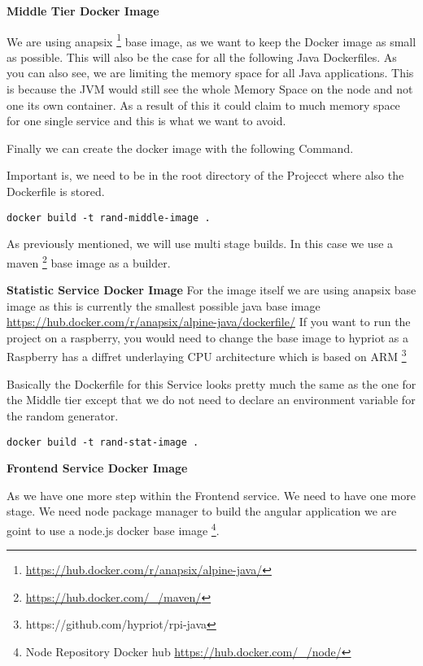 \textbf{Middle Tier Docker Image}


We are using anapsix \footnote{\url{https://hub.docker.com/r/anapsix/alpine-java/}} base image, as we want to keep the Docker image as small as possible. This will also be the case for all the following Java Dockerfiles.
As you can also see, we are limiting the memory space for all Java applications. This is because the JVM would still see the whole Memory Space on the node and not one its own container. As a result of this it could claim to much memory space for one single service and this is what we want to avoid.

Finally we can create the docker image with the following Command.

Important is, we need to be in the root directory of the Projecct where also the Dockerfile is stored.
\begin{verbatim}
docker build -t rand-middle-image .
\end{verbatim}
As previously mentioned, we will use multi stage builds. In this case we use a maven \footnote{\url{https://hub.docker.com/_/maven/}} base image as a builder.
\newpage

\textbf{Statistic Service Docker Image}
For the image itself we are using anapsix base image as this is currently the smallest possible java base image \url{https://hub.docker.com/r/anapsix/alpine-java/dockerfile/}
If you want to run the project on a raspberry, you would need to change the base image to hypriot as a Raspberry has a diffret underlaying CPU architecture which is based on ARM \footnote{https://github.com/hypriot/rpi-java}



Basically the Dockerfile for this Service looks pretty much the same as the one for the Middle tier except that we do not need to declare an environment variable for the random generator.

\begin{verbatim}
docker build -t rand-stat-image .
\end{verbatim}
\newpage

\textbf{Frontend Service Docker Image}

As we have one more step within the Frontend service. We need to have one more stage. We need node package manager to build the angular application we are goint to use a node.js docker base image \footnote{ Node Repository Docker hub \url{https://hub.docker.com/_/node/}}.


